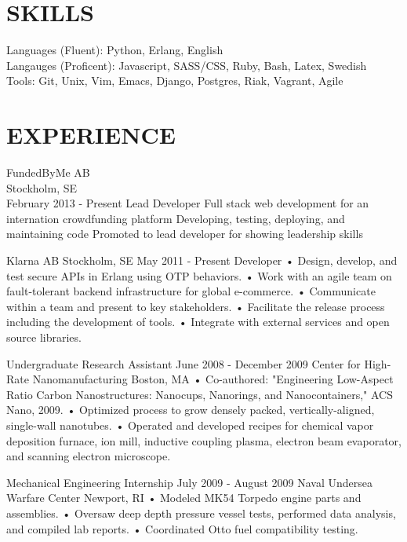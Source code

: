 \documentclass{res}
\begin{document}

\address{\bf  Högbergsgatan 66C \\ Stockholm, 11854, Sweden \\ +46 700012715 \\ rebecca@meritz.com \\ github.com/rmeritz}

\begin{resume}

\section{SKILLS}
    Languages (Fluent): Python, Erlang, English \\
    Langauges (Proficent): Javascript, SASS/CSS, Ruby, Bash, Latex, Swedish \\
    Tools: Git, Unix, Vim, Emacs, Django, Postgres, Riak, Vagrant, Agile \\

\section{EXPERIENCE}
FundedByMe AB \\
Stockholm, SE \\
February 2013 - Present
Lead Developer
Full stack web development for an internation crowdfunding platform
Developing, testing, deploying, and maintaining code
Promoted to lead developer for showing leadership skills

Klarna AB
Stockholm, SE
May 2011 - Present
Developer
• Design, develop, and test secure APIs in Erlang using OTP behaviors.
• Work with an agile team on fault-tolerant backend infrastructure for global e-commerce.
• Communicate within a team and present to key stakeholders.
• Facilitate the release process including the development of tools.
• Integrate with external services and open source libraries.

Undergraduate Research Assistant
June 2008 - December 2009
Center for High-Rate Nanomanufacturing
Boston, MA
• Co-authored: "Engineering Low-Aspect Ratio Carbon Nanostructures: Nanocups, Nanorings,
and Nanocontainers," ACS Nano, 2009.
• Optimized process to grow densely packed, vertically-aligned, single-wall nanotubes.
• Operated and developed recipes for chemical vapor deposition furnace, ion mill, inductive
coupling plasma, electron beam evaporator, and scanning electron microscope.

Mechanical Engineering Internship
July 2009 - August 2009
Naval Undersea Warfare Center
Newport, RI
• Modeled MK54 Torpedo engine parts and assemblies.
• Oversaw deep depth pressure vessel tests, performed data analysis, and compiled lab reports.
• Coordinated Otto fuel compatibility testing.


\end{resume}
\end{document}
